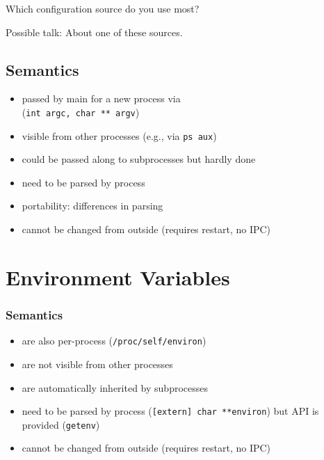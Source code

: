 \documentclass{beamer}
\begin{document}
\begin{assignment}
	\begin{task}
	Which configuration source do you use most?
	\end{task}

	\begin{task}
	Possible talk: About one of these sources.
	\end{task}
\end{assignment}

\subsection{Semantics}

\begin{frame}
	\begin{itemize}
	\item passed by main for a new process via \\ (\texttt{int argc, char ** argv})
	\item visible from other processes (e.g., via \texttt{ps aux})
	\item could be passed along to subprocesses but hardly done
	\item need to be parsed by process
	\item portability: differences in parsing
	\item cannot be changed from outside (requires restart, no IPC)
	\end{itemize}
\end{frame}

\section{Environment Variables}

\begin{frame}
	\frametitle{Semantics}
	\begin{itemize}
	\item are also per-process (\texttt{/proc/self/environ})
	\item are not visible from other processes
	\item are automatically inherited by subprocesses
	\item need to be parsed by process (\texttt{[extern] char **environ}) but API is provided (\texttt{getenv})
	\item cannot be changed from outside (requires restart, no IPC)
	\end{itemize}
\end{frame}
\end{document}
